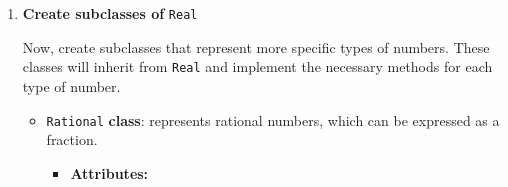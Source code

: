 \begin{enumerate}
\begin{itemize}
\begin{itemize}
                    \item \texttt{divide(Real other)}: Divides the current number by another \texttt{Real} object and returns the result.

                \end{itemize}

        \end{itemize}

    These methods should be implemented so that they can be used by any type of number in the system. However, since \texttt{Real} is an abstract class, the subclasses are expected to implement specific behaviors where needed.

        \begin{itemize}

            \item \textbf{Constructor:}

                \begin{itemize}

                    \item \texttt{Real(double value)}: This constructor initializes the \texttt{value} attribute to a specific value passed as an argument.

                \end{itemize}

        \end{itemize}

    \textbf{Ensure that neither the constructor nor the attributes are public}. Use the appropriate visibility modifiers to restrict access but allow inheritance.

    \item \textbf{Create subclasses of} \texttt{Real}

    Now, create subclasses that represent more specific types of numbers. These classes will inherit from \texttt{Real} and implement the necessary methods for each type of number.

        \begin{itemize}

            \item \texttt{Rational} \textbf{class}: represents rational numbers, which can be expressed as a fraction.

                \begin{itemize}

                    \item \textbf{Attributes:}

                        \begin{itemize}


\end{itemize}
\end{itemize}
\end{itemize}
\end{enumerate}
